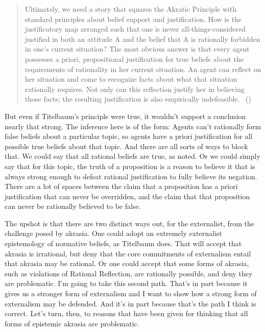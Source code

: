 \documentclass[
  10pt,
  letterpaper,
  twoside]{scrbook}
\begin{document}
\begin{quote}
Ultimately, we need a story that squares the Akratic Principle with
standard principles about belief support and justification. How is the
justificatory map arranged such that one is never all-things-considered
justified in both an attitude A and the belief that A is rationally
forbidden in one's current situation? The most obvious answer is that
every agent possesses a priori, propositional justification for true
beliefs about the requirements of rationality in her current situation.
An agent can reflect on her situation and come to recognize facts about
what that situation rationally requires. Not only can this reflection
justify her in believing those facts; the resulting justification is
also empirically indefeasible. ~()
\end{quote}

But even if Titelbaum's principle were true, it wouldn't support a
conclusion nearly that strong. The inference here is of the form: Agents
can't rationally form false beliefs about a particular topic, so agents
have a priori justification for all possible true beliefs about that
topic. And there are all sorts of ways to block that. We could say that
all rational beliefs are true, as noted. Or we could simply say that for
this topic, the truth of a proposition is a reason to believe it that is
always strong enough to defeat rational justification to fully believe
its negation. There are a lot of spaces between the claim that a
proposition has a priori justification that can never be overridden, and
the claim that that proposition can never be rationally believed to be
false.

The upshot is that there are two distinct ways out, for the externalist,
from the challenge posed by akrasia. One could adopt an extremely
externalist epistemology of normative beliefs, as Titelbaum does. That
will accept that akrasia is irrational, but deny that the core
commitments of externalism entail that akrasia may be rational. Or one
could accept that some forms of akrasia, such as violations of Rational
Reflection, are rationally possible, and deny they are problematic. I'm
going to take this second path. That's in part because it gives us a
stronger form of externalism and I want to show how a strong form of
externalism may be defended. And it's in part because that's the path I
think is correct. Let's turn, then, to reasons that have been given for
thinking that all forms of epistemic akrasia are problematic.
\end{document}
